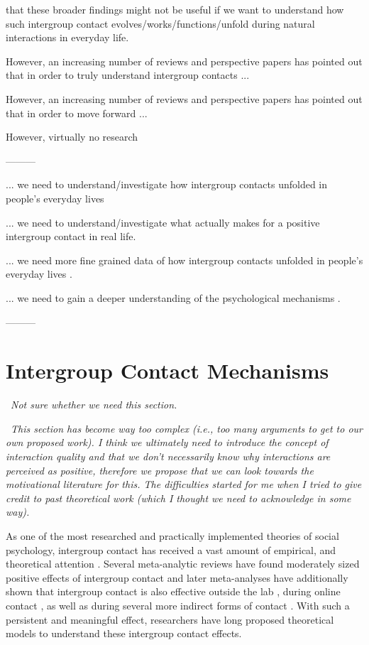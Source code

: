 that these broader findings might not be useful if we want to understand how such intergroup contact evolves/works/functions/unfold during natural interactions in everyday life. 

However, an increasing number of reviews and perspective papers has pointed out that in order to truly understand intergroup contacts ...

However, an increasing number of reviews and perspective papers has pointed out that in order to move forward ...

However, virtually no research 

---------

... we need to understand/investigate how intergroup contacts unfolded in people's everyday lives

... we need to understand/investigate what actually makes for a positive intergroup contact in real life.

... we need more fine grained data of how intergroup contacts unfolded in people's everyday lives \citep[e.g.,][]{MacInnis2015}.

... we need to gain a deeper understanding of the psychological mechanisms .

---------


\section{Intergroup Contact Mechanisms}
\faQuestionCircle\ \textit{Not sure whether we need this section.}

\faExclamationCircle\ \textit{This section has become way too complex (i.e., too many arguments to get to our own proposed work). I think we ultimately need to introduce the concept of interaction quality and that we don't necessarily know why interactions are perceived as positive, therefore we propose that we can look towards the motivational literature for this. The difficulties started for me when I tried to give credit to past theoretical work (which I thought we need to acknowledge in some way).}

As one of the most researched and practically implemented theories of social psychology, intergroup contact has received a vast amount of empirical, and theoretical attention \citep[][]{Dovidio2017}. Several meta-analytic reviews have found moderately sized positive effects of intergroup contact \citep[][]{Tropp2005, Pettigrew2006, Davies2011} and later meta-analyses have additionally shown that intergroup contact is also effective outside the lab \citep[][]{Beelmann2014, Lemmer2015}, during online contact \citep[][]{White2020}, as well as during several more indirect forms of contact \citep[][]{Miles2014, Zhou2019, Harwood2021}. With such a persistent and meaningful effect, researchers have long proposed theoretical models to understand these intergroup contact effects. 

